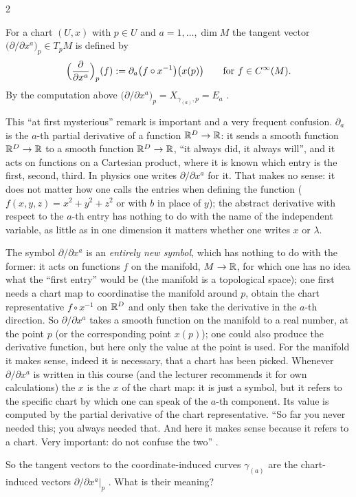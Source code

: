 \begin{paracol}{2}
\begin{definition}\label{def:tv-ddx}
For a chart $(U,x)$ with $p\in U$ and $a=1,\dots,\dim M$ the tangent vector $\bigl(\partial/\partial x^a\bigr)_p\in T_pM$ is defined by
\[
  \Bigl(\frac{\partial}{\partial x^a}\Bigr)_p(f):=\partial_a\bigl(f\circ x^{-1}\bigr)\bigl(x(p)\bigr)\qquad\text{for }f\in C^\infty(M).
\]
By the computation above $\bigl(\partial/\partial x^a\bigr)_p=X_{\gamma_{(a)},p}=E_a$   .
\end{definition}

\begin{intuition}\label{int:tv-two-partials}
This ``at first mysterious'' remark is important and a very frequent confusion. $\partial_a$ is the $a$-th partial derivative of a function $\mathbb{R}^D\to\mathbb{R}$: it sends a smooth function $\mathbb{R}^D\to\mathbb{R}$ to a smooth function $\mathbb{R}^D\to\mathbb{R}$, ``it always did, it always will'', and it acts on functions on a Cartesian product, where it is
known which entry is the first, second, third. In physics one writes $\partial/\partial x^a$ for it. That makes no sense: it does not matter how one calls the entries when defining the function ($f(x,y,z)=x^2+y^2+z^2$ or with $b$ in place of $y$); the abstract derivative with respect to the $a$-th
entry has nothing to do with the name of the independent variable, as little as in one dimension it matters whether one writes $x$ or $\lambda$.\par
The symbol $\partial/\partial x^a$ is an \emph{entirely new symbol}, which has nothing to do with the former: it acts on functions $f$ on the manifold, $M\to\mathbb{R}$, for which one has no idea what the ``first entry'' would be (the manifold is a topological space); one first needs a chart map to coordinatise the manifold around $p$, obtain the chart
representative $f\circ x^{-1}$ on $\mathbb{R}^D$ and only then take the derivative in the $a$-th direction. So $\partial/\partial x^a$ takes a smooth function on the manifold to a real number, at the point $p$ (or the corresponding point $x(p)$); one could also produce the derivative function, but here only the value at the point is used. For the
manifold it makes sense, indeed it is necessary, that a chart has been picked. Whenever $\partial/\partial x^a$ is written in this course (and the lecturer recommends it for own calculations) the $x$ is the $x$ of the chart map: it is just a symbol, but it refers to the specific chart by which one can speak of the $a$-th component. Its value is
computed by the partial derivative of the chart representative. ``So far you never needed this; you always needed that. And here it makes sense because it refers to a chart. Very important: do not confuse the two''      .
\end{intuition}
So the tangent vectors to the coordinate-induced curves $\gamma_{(a)}$ are the chart-induced vectors $\partial/\partial x^a|_p$    . What is their meaning?


\end{paracol}
